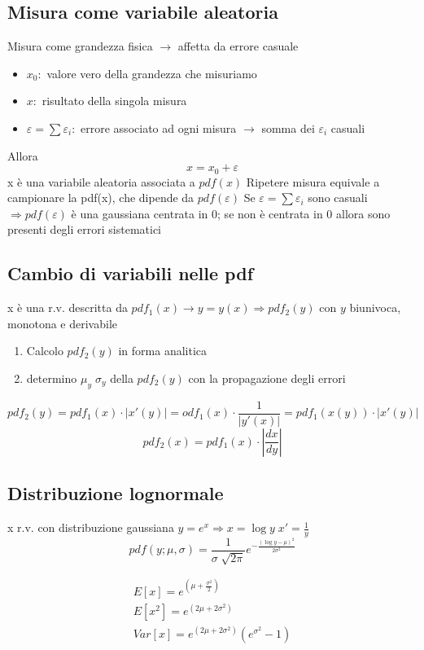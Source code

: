 \documentclass[12pt]{report}
\theoremstyle{remark}
\theoremstyle{theorem}
\begin{document}
\subsection*{Misura come variabile aleatoria}
Misura come grandezza fisica $\to$ affetta da errore casuale
\begin{itemize}
	\item $x_0:$ valore vero della grandezza che misuriamo
	\item $x:$ risultato della singola misura
	\item $\varepsilon = \sum \varepsilon_i:$ errore associato ad ogni misura $\to$ somma dei $\varepsilon_i$ casuali
\end{itemize}
Allora
\[x = x_0 + \varepsilon\]
x è una variabile aleatoria associata a $pdf(x)$ \newline
Ripetere misura equivale a campionare la pdf(x), che dipende da $pdf(\varepsilon)$ \newline
Se $\varepsilon = \sum \varepsilon_i$ sono casuali $\Rightarrow pdf(\varepsilon)$ è una gaussiana centrata in 0; se non è centrata in 0 allora sono presenti degli errori sistematici

\subsection*{Cambio di variabili nelle pdf}
x è una r.v. descritta da $pdf_1(x) \to y=y(x) \Rightarrow pdf_2(y)$ con $y$ biunivoca, monotona e derivabile
\begin{enumerate}
	\item Calcolo $pdf_2(y)$ in forma analitica
	\item determino $\mu_y \; \sigma_y$ della $pdf_2(y)$ con la propagazione degli errori
\end{enumerate}

\[pdf_2(y) = pdf_1(x) \cdot |x'(y)| = odf_1(x) \cdot \frac{1}{|y'(x)|} = pdf_1(x(y))\cdot |x'(y)|\]
\[pdf_2(x) = pdf_1(x) \cdot \left| \frac{dx}{dy} \right|\]

\subsection*{Distribuzione lognormale}
x r.v. con distribuzione gaussiana \newline
$y=e^x \Rightarrow x=\log{y} \; x' = \frac{1}{y}$
\[pdf(y;\mu,\sigma) = \frac{1}{\sigma \sqrt[]{2\pi}} e^{-\frac{{(\log{y}-\mu)}^2}{2\sigma^2}}\]

\begin{gather*}
	E[x] = e^{\left(\mu + \frac{\sigma^2}{2}\right)}\\
	E[x^2] = e^{(2\mu + 2\sigma^2)} \\
	Var[x] = e^{(2\mu + 2\sigma^2)}\left(e^{\sigma^2}-1\right)
\end{gather*}
\end{document}
